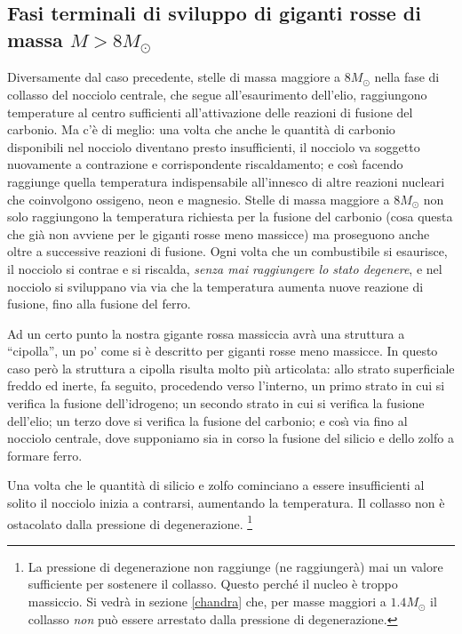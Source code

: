 \subsection{Fasi terminali di sviluppo di giganti rosse di massa $M>8 M_{\odot}$}
Diversamente dal caso precedente, stelle di massa maggiore a $8M_{\odot}$ nella fase di collasso del nocciolo centrale, che segue all'esaurimento dell'elio, raggiungono temperature al centro sufficienti all'attivazione delle reazioni di fusione del carbonio.
Ma c'è di meglio: una volta che anche le quantit\`{a} di carbonio disponibili nel nocciolo diventano presto insufficienti, il nocciolo va soggetto nuovamente a contrazione e corrispondente riscaldamento; e cos\`{\i}{} facendo raggiunge quella temperatura indispensabile all'innesco di altre reazioni nucleari che coinvolgono ossigeno, neon e magnesio. Stelle di massa maggiore a $8M_{\odot}$ non solo raggiungono la temperatura richiesta per la fusione del carbonio (cosa questa che gi\`{a} non avviene per le giganti rosse meno massicce) ma proseguono anche oltre a successive reazioni di fusione. Ogni volta che un combustibile si esaurisce, il nocciolo si contrae e si riscalda, \emph{senza mai raggiungere lo stato degenere}, e nel nocciolo si sviluppano via via che la temperatura aumenta nuove reazione di fusione, fino alla fusione del ferro.
\par
Ad un certo punto la nostra gigante rossa massiccia avr\`{a} una struttura a ``cipolla'', un po' come si è descritto per giganti rosse meno massicce. In questo caso però la struttura a cipolla risulta molto più articolata: allo strato superficiale freddo ed inerte, fa seguito, procedendo verso l'interno, un primo strato in cui si verifica la fusione dell'idrogeno; un secondo strato in cui si verifica la fusione dell'elio; un terzo dove si verifica la fusione del carbonio; e cos\`{\i}{} via fino al nocciolo centrale, dove supponiamo sia in corso la fusione del silicio  e dello zolfo a formare ferro.
\par
Una volta che le quantit\`{a} di silicio e zolfo cominciano a essere insufficienti al solito il nocciolo inizia a contrarsi, aumentando la temperatura. Il collasso non è ostacolato dalla pressione di degenerazione.
\footnote{La pressione di degenerazione non raggiunge (ne raggiunger\`{a}) mai un valore sufficiente per sostenere il collasso. Questo perch\'{e} il nucleo è troppo massiccio. Si vedr\`{a} in sezione \ref{chandra} che, per masse maggiori a $1.4M_{\odot}$ il collasso \emph{non} può essere arrestato dalla pressione di degenerazione.}
